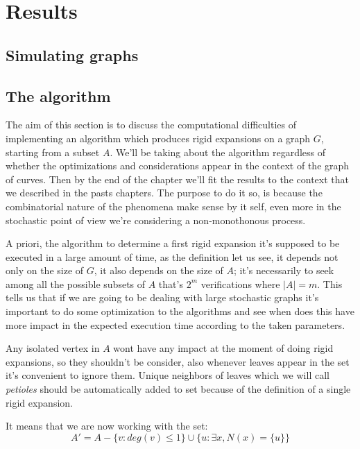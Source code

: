 
\chapter{Results} %

\label{Chapter3} %





\section{Simulating graphs}



\section{The algorithm}
The aim of this section is to discuss the computational difficulties of implementing an algorithm which produces rigid expansions on a graph $G$, starting from a subset $A$. We'll be taking about the algorithm regardless of whether the optimizations and considerations appear in the context of the graph of curves. Then by the end of the chapter we'll fit the results to the context that we described in the pasts chapters. The purpose to do it so, is because the combinatorial nature of the phenomena make sense by it self, even more in the stochastic point of view we're considering a non-monothonous process.

A priori, the algorithm to determine a first rigid expansion it's supposed to be executed in a large amount of time, as the definition let us see, it depends not only on the size of $G$, it also depends on the size of $A$; it's necessarily to seek among all the possible subsets of $A$ that's $2^{m}$ verifications where $|A| = m$. This tells us that if we are going to be dealing with large stochastic graphs it's important to do some optimization to the algorithms and see when does this have more impact in the expected execution time according to the taken parameters.

Any isolated vertex in $A$ wont have any impact at the moment of doing rigid expansions, so they shouldn't be consider, also whenever leaves appear in the set it's convenient to ignore them. Unique neighbors of leaves which we will call \textit{petioles} should be automatically added to set because of the definition of a single rigid expansion.

It means that we are now working with the set:
$$A' = A - \{v: deg(v)\leq 1 \} \cup \{u: \exists x, N(x)=\{u\}\} $$

